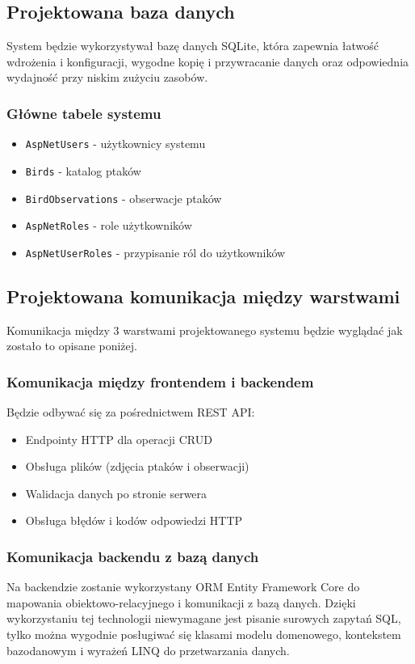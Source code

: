 \subsection{Projektowana baza danych}
System będzie wykorzystywał bazę danych SQLite, która zapewnia łatwość wdrożenia i konfiguracji, wygodne kopię i przywracanie danych oraz odpowiednia wydajność przy niskim zużyciu zasobów.

\subsubsection{Główne tabele systemu}
\begin{itemize}
	\item \texttt{AspNetUsers} - użytkownicy systemu
	\item \texttt{Birds} - katalog ptaków
	\item \texttt{BirdObservations} - obserwacje ptaków
	\item \texttt{AspNetRoles} - role użytkowników
	\item \texttt{AspNetUserRoles} - przypisanie ról do użytkowników
\end{itemize}

\subsection{Projektowana komunikacja między warstwami}
Komunikacja między 3 warstwami projektowanego systemu będzie wyglądać jak zostało to opisane poniżej.

\subsubsection{Komunikacja między frontendem i backendem}
Będzie odbywać się za pośrednictwem REST API:
\begin{itemize}
	\item Endpointy HTTP dla operacji CRUD
	\item Obsługa plików (zdjęcia ptaków i obserwacji)
	\item Walidacja danych po stronie serwera
	\item Obsługa błędów i kodów odpowiedzi HTTP
\end{itemize}

\subsubsection{Komunikacja backendu z bazą danych}
Na backendzie zostanie wykorzystany ORM Entity Framework Core do mapowania obiektowo-relacyjnego i komunikacji z bazą danych. Dzięki wykorzystaniu tej technologii niewymagane jest pisanie surowych zapytań SQL, tylko można wygodnie posługiwać się klasami modelu domenowego, kontekstem bazodanowym i wyrażeń LINQ do przetwarzania danych.


